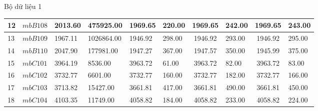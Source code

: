 \documentclass[compress]{beamer}
\begin{document}
\begin{frame}{Bộ dữ liệu 1}
\begin{longtable}{|p{0.2cm}|p{1.0cm}|p{0.55cm}|p{0.85cm}|p{0.6cm}|p{0.7cm}|c|p{0.85cm}|c|p{0.85cm}|}
12&$mbB108$ &    2013.60 & 475925.00 &    1969.65 &     220.00 &    1969.65 &     242.00 &    1969.65 &     243.00\\ \hline 
13&$mbB109$ &    1967.11 &1026864.00 &    1946.92 &     298.00 &    1946.92 &     293.00 &    1946.92 &     295.00\\ \hline 
14&$mbB110$ &    2047.90 & 177981.00 &    1947.27 &     367.00 &    1947.57 &     350.00 &    1945.99 &     375.00\\ \hline 
15&$mbC101$ &    3964.19 &   8536.00 &    3963.72 &      61.00 &    3963.72 &      82.00 &    3963.72 &      83.00\\ \hline 
16&$mbC102$ &    3732.77 &   6601.00 &    3732.77 &     160.00 &    3732.77 &     182.00 &    3732.77 &     166.00\\ \hline 
17&$mbC103$ &    3713.82 &  15427.00 &    3661.81 &     417.00 &    3661.81 &     490.00 &    3661.81 &     450.00\\ \hline 
18&$mbC104$ &    4103.35 &  11749.00 &    4058.82 &     184.00 &    4058.82 &     233.00 &    4058.82 &     224.00\\ \hline 

\end{longtable}
\end{frame}
\end{document}
